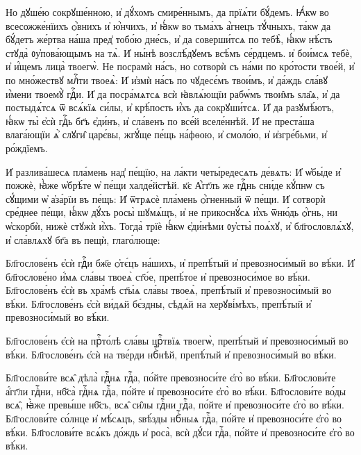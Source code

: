 \hKv Но дꙋше́ю сокрꙋше́нною, и҆  дꙋ́хомъ смире́ннымъ, да прїѧ́ти бꙋ́демъ. 
\hKv Ꙗ҆́кѡ во  всесожже́нїихъ ѻ҆́внихъ и҆ ю҆́нчихъ, и҆ ꙗ҆́кѡ во тьма́хъ  а҆́гнецъ тꙋ́чныхъ, та́кѡ да бꙋ́детъ же́ртва  на́ша пред̾ тобо́ю дне́сь, 
и҆ да соверши́тсѧ по  тебѣ̀, ꙗ҆́кѡ нѣ́сть стꙋда̀ ᲂу҆пова́ющымъ на тѧ̀. 
\hKv  И҆ ны́нѣ возслѣ́дꙋемъ всѣ́мъ се́рдцемъ. и҆ бои́мсѧ тебѐ,  и҆ и҆́щемъ лица̀ твоегѡ̀. 
\hKv Не посрамѝ на́съ, но  сотворѝ съ на́ми по кро́тости твое́й, и҆ по мно́жествꙋ  млⷭ҇ти твоеѧ̀: 
\hKv И҆ и҆змѝ на́съ по чꙋдесє́мъ твои́мъ,  и҆ да́ждь сла́вꙋ и҆́мени твоемꙋ̀ гдⷭ҇и. 
\hKv И҆ да  посра́мѧтсѧ всѝ ꙗ҆влѧ́ющїи рабѡ́мъ твои̑мъ ѕла̑ѧ, и҆ да  постыдѧ́тсѧ ѿ всѧ́кїѧ си́лы, и҆ крѣ́пость и҆́хъ да  сокрꙋши́тсѧ. 
\hKv И҆ да разꙋмѣ́ютъ, ꙗ҆́кѡ ты̀ є҆сѝ  гдⷭ҇ь бг҃ъ є҆ди́нъ, и҆ сла́венъ по все́й вселе́ннѣй. 
\hKv  И҆ не преста́ша влага́ющїи ѧ҆̀ слꙋги̑ царє́вы, жгꙋ́ще пе́щь  на́фѳою, и҆ смоло́ю, и҆ и҆згре́бьми, и҆ ро́ждїемъ.  
%

\hKv И҆ разлива́шесѧ пла́мень над̾ пе́щїю, на  ла́кти четы́редесѧть де́вѧть: 
\hKv И҆ ѡ҆бы́де и҆ пожжѐ,  ꙗ҆̀же ѡ҆брѣ́те ѡ҆ пе́щи халде́йстѣй. к҃є А҆́гг҃лъ же  гдⷭ҇нь сни́де кꙋ́пнѡ съ сꙋ́щими ѡ҆ а҆за́рїи въ пе́щь: 
\hKv  И҆ ѿтрѧсѐ пла́мень ѻ҆́гненный  ѿ пе́щи. 
\hKv И҆ сотворѝ сре́днее пе́щи, ꙗ҆́кѡ  дꙋ́хъ росы̀ шꙋмѧ́щъ, и҆ не прикоснꙋ́сѧ и҆́хъ ѿню́дь  ѻ҆́гнь, ни ѡ҆скорбѝ, нижѐ стꙋжѝ и҆̀хъ. 
\hKv Тогда̀  трїѐ ꙗ҆́кѡ є҆ди́нѣми ᲂу҆сты̀ поѧ́хꙋ, и҆ бл҃гословлѧ́хꙋ,  и҆ сла́влѧхꙋ бг҃а въ пещѝ, глаго́люще: 
%

\hKv Бл҃гослове́нъ є҆сѝ гдⷭ҇и бж҃е ѻ҆тє́цъ  на́шихъ, и҆ препѣ́тый и҆ превозноси́мый во вѣ́ки. 
\hKv И҆  бл҃гослове́но и҆́мѧ сла́вы твоеѧ̀ ст҃о́е, препѣ́тое и҆  превозноси́мое во вѣ́ки. 
\hKv Бл҃гослове́нъ є҆сѝ въ  хра́мѣ ст҃ы́ѧ сла́вы твоеѧ̀, препѣ́тый и҆ превозноси́мый  во вѣ́ки. 
\hKv Бл҃гослове́нъ є҆сѝ ви́дѧй бє́здны,  сѣдѧ́й на херꙋві́мѣхъ, препѣ́тый и҆ превозноси́мый во  вѣ́ки. 
%

\hKv Бл҃гослове́нъ є҆сѝ на прⷭ҇то́лѣ сла́вы  црⷭ҇твїѧ твоегѡ̀, препѣ́тый и҆ превозноси́мый во вѣ́ки.  
\hKv Бл҃гослове́нъ є҆сѝ на тве́рди нбⷭ҇нѣй, препѣ́тый  и҆ превозноси́мый во вѣ́ки. 
%


\cuLettrine
Бл҃гослови́те всѧ̑ дѣла̀ гдⷭ҇нѧ гдⷭ҇а, по́йте  превозноси́те є҆го̀ во вѣ́ки. 
\hKv Бл҃гослови́те а҆́гг҃ли  гдⷭ҇ни, нб҃са̀ гдⷭ҇нѧ гдⷭ҇а, по́йте и҆ превозноси́те є҆го̀  во вѣ́ки. 
\hKv Бл҃гослови́те во́ды всѧ̑, ꙗ҆̀же превы́ше  нб҃съ, всѧ̑ си̑лы гдⷭ҇ни гдⷭ҇а, по́йте и҆ превозноси́те  є҆го̀ во вѣ́ки. 
\hKv Бл҃гослови́те со́лнце и҆ мѣ́сѧцъ,  ѕвѣ́зды нбⷭ҇ныѧ гдⷭ҇а, по́йте и҆ превозноси́те є҆го̀ во  вѣ́ки. 
\hKv Бл҃гослови́те всѧ́къ до́ждь и҆ роса̀, всѝ  дꙋ́си гдⷭ҇а, по́йте и҆ превозноси́те є҆го̀ во вѣ́ки.  
%

